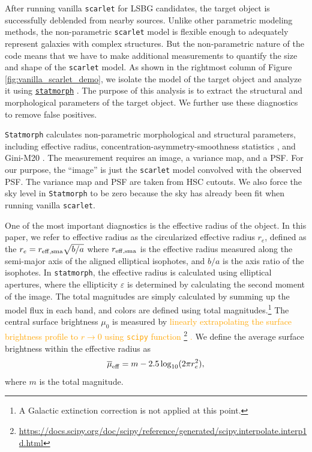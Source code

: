 \documentclass[twocolumn,astrosymb,twocolappendix,linenumbers]{aastex631}
\newcommand{\emphasize}{\textcolor{orange}}
\newcommand{\code}[1]{\texttt{#1}}
\begin{document}
\begin{CJK*}{UTF8}{gbsn}
After running vanilla \code{scarlet} for LSBG candidates, the target object is successfully deblended from nearby sources. Unlike other parametric modeling methods, the non-parametric \code{scarlet} model is flexible enough to adequately represent galaxies with complex structures. But the non-parametric nature of the code means that we have to make additional measurements to quantify the size and shape of the \code{scarlet} model. As shown in the rightmost column of Figure \ref{fig:vanilla_scarlet_demo}, we isolate the model of the target object and analyze it using \href{https://statmorph.readthedocs.io/en/latest/}{\code{statmorph}} \citep{statmorph}. The purpose of this analysis is to extract the structural and morphological parameters of the target object. We further use these diagnostics to remove false positives. 

\code{Statmorph} calculates non-parametric morphological and structural parameters, including effective radius, concentration-asymmetry-smoothness statistics \citep[CAS,][]{Conselice2003}, and Gini-M20 \citep{Abraham2003,Lotz2004}. The measurement requires an image, a variance map, and a PSF. For our purpose, the ``image'' is just the \code{scarlet} model convolved with the observed PSF. The variance map and PSF are taken from HSC cutouts. We also force the sky level in \code{Statmorph} to be zero because the sky has already been fit when running vanilla \code{scarlet}. 

One of the most important diagnostics is the effective radius of the object. In this paper, we refer to effective radius as the circularized effective radius $r_{e}$, defined as the $r_{e} = r_{\rm eff, sma} \sqrt{b/a}$ where $r_{\rm eff, sma}$ is the effective radius measured along the semi-major axis of the aligned elliptical isophotes, and $b/a$ is the axis ratio of the isophotes. In \code{statmorph}, the effective radius is calculated using elliptical apertures, where the ellipticity $\varepsilon$ is determined by calculating the second moment of the image. The total magnitudes are simply calculated by summing up the model flux in each band, and colors are defined using total magnitudes.\footnote{A Galactic extinction correction is not applied at this point.} The central surface brightness $\mu_0$ is measured by \emphasize{linearly extrapolating the surface brightness profile to $r\to 0$ using \code{scipy} function \footnote{\url{https://docs.scipy.org/doc/scipy/reference/generated/scipy.interpolate.interp1d.html}} \citep{scipy}.} We define the average surface brightness within the effective radius as 
\begin{equation}\label{eq:mu_eff}
    \overline{\mu}_{\rm eff} = m - 2.5 \log_{10}(2 \pi r_e^2),
\end{equation}
where $m$ is the total magnitude. 


\end{CJK*}
\end{document}
